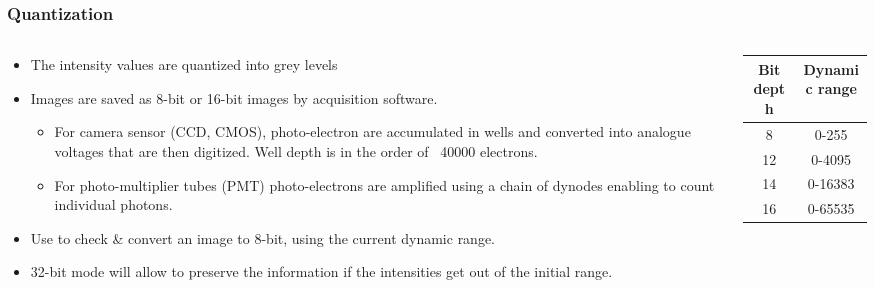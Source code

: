 \documentclass[ignorenonframetext,aspectratio=169,10pt,xcolor=table]{beamer}
\begin{document}
\begin{frame} \frametitle{Quantization}
  \begin{columns}
    \begin{column}{0.7\textwidth}
      \begin{itemize}
      \item The intensity values are quantized into grey levels
      \item Images are saved as 8-bit or 16-bit images by acquisition
        software.
        \begin{itemize}
        \item For camera sensor (CCD, CMOS), photo-electron are
          accumulated in wells and converted into analogue voltages that are
          then digitized. Well depth is in the order of ~40000 electrons.
        \item For photo-multiplier tubes (PMT) photo-electrons are
          amplified using a chain of dynodes enabling to count individual
          photons.
        \end{itemize}
      \end{itemize}
      \begin{itemize}
      \item Use  to check \& convert an image
        to 8-bit, using the current dynamic range.
      \item 32-bit mode will allow to preserve the information if the
        intensities get out of the initial range.
      \end{itemize}
    \end{column}
    \begin{column}{0.3\textwidth}
      \begin{center} \small {}
        \begin{tabular}{cc}
          Bit depth & Dynamic range \\ \hline 8 &
          0-255 \\ 12 & 0-4095\\ 14 & 0-16383\\ 16 & 0-65535
        \end{tabular}
      \end{center}
    \end{column}
  \end{columns}
\end{frame}
\end{document}
